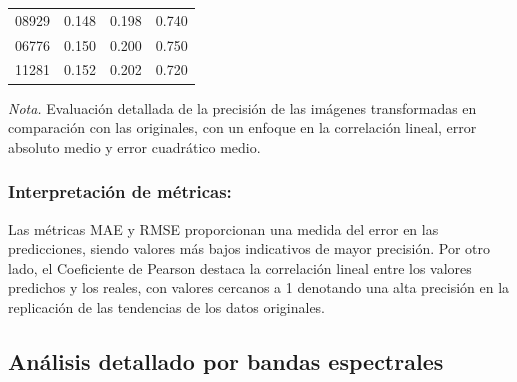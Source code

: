 \begin{table}[H]
\begin{spacing}{8}
\begin{tabularx}{\linewidth}{*{4}{X}}
                        08929 & 0.148 & 0.198 & 0.740 \\ 
                        06776 & 0.150 & 0.200 & 0.750 \\ 
                        11281 & 0.152 & 0.202 & 0.720 \\ 
                        \bottomrule
                    \end{tabularx}
                \end{spacing}
                \vspace{1\baselineskip}
                \textit{Nota.} Evaluación detallada de la precisión de las imágenes transformadas en comparación con las originales, con un enfoque en la correlación lineal, error absoluto medio y error cuadrático medio.
                \label{valores_metricas}
            \end{table}
            
            \subsubsection{Interpretación de métricas:}

            Las métricas MAE y RMSE proporcionan una medida del error en las predicciones, siendo valores más bajos indicativos de mayor precisión. Por otro lado, el Coeficiente de Pearson destaca la correlación lineal entre los valores predichos y los reales, con valores cercanos a 1 denotando una alta precisión en la replicación de las tendencias de los datos originales.

        \subsection{Análisis detallado por bandas espectrales}

